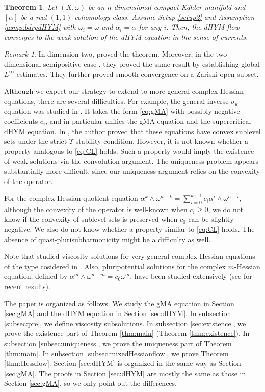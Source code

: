 \documentclass{amsart}
\numberwithin{equation}{section}
\theoremstyle{plain}
\newtheorem{thm}[equation]{Theorem}
\theoremstyle{definition}
\theoremstyle{remark}
\newtheorem{remark}[equation]{Remark}
\begin{document}
\begin{thm}\label{thm:dHYMflow}
    Let $(X,\omega)$ be an $n$-dimensional compact Kähler manifold and $[\alpha]$ be a real $(1,1)$ cohomology class. Assume Setup \ref{setup2} and Assumption \ref{asmp:bdrydHYM} with $\omega_i=\omega$ and $\alpha_i=\alpha$ for any $i$. 
    Then, the dHYM flow converges to the weak solution of the dHYM equation in the sense of currents.
\end{thm}

\begin{remark}
    In dimension two, \cite{Mur} proved the theorem. Moreover, in the two-dimensional semipositive case \cite{FYZ}, they proved the same result by establishing global $L^\infty$ estimates. They further proved smooth convergence on a Zariski open subset.
\end{remark}

Although we expect our strategy to extend to more general complex Hessian equations, there are several difficulties. 
For example, the general inverse $\sigma_k$ equation was studied in \cite{Lina,Linb}. It takes the form \eqref{eq:gMA} with possibly negative coefficients $c_i$, and in particular unifies the gMA equation and the supercritical dHYM equation. 
In \cite{Lina}, the author proved that these equations have convex sublevel sets under the strict $\Upsilon$-stability condition. However, it is not known whether a property analogous to \eqref{eq:CL} holds. Such a property would imply the existence of weak solutions via the convolution argument. The uniqueness problem appears substantially more difficult, since our uniqueness argument relies on the convexity of the operator.

For the complex Hessian quotient equation $\alpha^k\wedge\omega^{n-k}=\sum_{i=0}^{k-1}c_i\alpha^i\wedge\omega^{n-i}$, although the convexity of the operator is well-known when $c_i\ge0$, we do not know if the convexity of sublevel sets is preserved when $c_0$ can be slightly negative. We also do not know whether a property similar to \eqref{eq:CL} holds. The absence of quasi-plurisubharmonicity might be a difficulty as well. 

Note that \cite{CX25a,CX25b} studied viscosity solutions for very general complex Hessian equations of the type cosidered in \cite{Sze}. Also, pluripotential solutions for the complex $m$-Hessian equation, defined by $\alpha^m\wedge\omega^{n-m}=c_0\omega^m$, have been studied extensively (see \cite{KN,PSWZ} for recent results). 

The paper is organized as follows. We study the gMA equation in Section \ref{sec:gMA} and the dHYM equation in Section \ref{sec:dHYM}. In subsection \ref{subsec:pre}, we define viscosity subsolutions. In subsection \ref{sec:existence}, we prove the existence part of Theorem \ref{thm:main} (Theorem \ref{thm:existence}). In subsection \ref{subsec:uniqueness}, we prove the uniqueness part of Theorem \ref{thm:main}. In subsection \ref{subsec:mixedHessianflow}, we prove Theorem \ref{thm:Hessflow}. Section \ref{sec:dHYM} is organized in the same way as Section \ref{sec:gMA}. The proofs in Section \ref{sec:dHYM} are mostly the same as those in Section \ref{sec:gMA}, so we only point out the differences.
\end{document}
